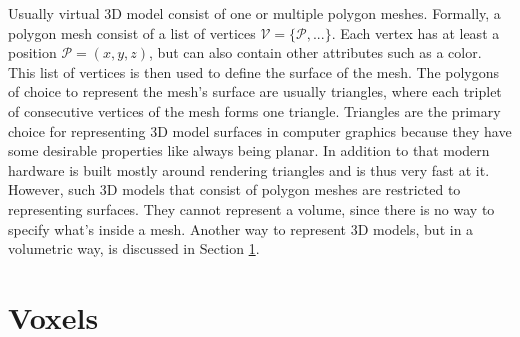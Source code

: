 Usually virtual 3D model consist of one or multiple polygon meshes. Formally, a polygon mesh consist of a list of vertices $\mathcal{V} = \{\mathcal{P}, ...\}$. Each vertex has at least a position $\mathcal{P} = (x, y, z)$, but can also contain other attributes such as a color. This list of vertices is then used to define the surface of the mesh. The polygons of choice to represent the mesh's surface are usually triangles, where each triplet of consecutive vertices of the mesh forms one triangle. Triangles are the primary choice for representing 3D model surfaces in computer graphics because they have some desirable properties like always being planar. In addition to that modern hardware is built mostly around rendering triangles and is thus very fast at it.\\
However, such 3D models that consist of polygon meshes are restricted to representing surfaces. They cannot represent a volume, since there is no way to specify what's inside a mesh. Another way to represent 3D models, but in a volumetric way, is discussed in Section \ref{sec:voxels_concept}.

\section{Voxels}
\label{sec:voxels_concept}

